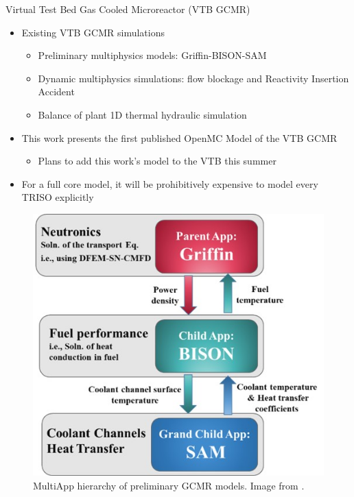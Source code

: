 \documentclass[9pt,t,aspectratio=169]{beamer}
\begin{document}
\begin{frame}{Virtual Test Bed Gas Cooled Microreactor (VTB GCMR)}
    \pause
    \begin{minipage}[t]{0.525\linewidth}
        \begin{itemize}
            \item<2-> Existing VTB GCMR simulations
            \begin{itemize}
                \item<3-> Preliminary multiphysics models: Griffin-BISON-SAM \cite{Stauff-preliminary-applications-2021,Stauff-applications-2022,Abdelhameed-ANS-2022}
                \item<4-> Dynamic multiphysics simulations: flow blockage and Reactivity Insertion Accident \cite{HF_MRs_ANL}
                \item<5-> Balance of plant 1D thermal hydraulic simulation \cite{Duchnowski_plant_balance_2022}
            \end{itemize}
            \item<6-> This work presents the first published OpenMC Model of the VTB GCMR
            \begin{itemize}
                \item<7->Plans to add this work's model to the VTB this summer
            \end{itemize}
            \item<8-> For a full core model, it will be prohibitively expensive to model every TRISO explicitly
        \end{itemize}
    \end{minipage}
    \hfill%
    \begin{minipage}[t]{0.425\linewidth}
        \pause
        \begin{figure}
            \centering
            \includegraphics[width=0.875\linewidth]{figures/gcmr_preliminary_mutliapps.png}
            \caption{MultiApp hierarchy of preliminary GCMR models. Image from \cite{Abdelhameed-ANS-2022}.}
        \end{figure}
    \end{minipage}

\end{frame}
\end{document}
